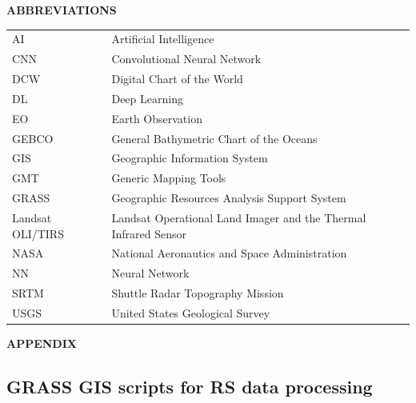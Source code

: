 \documentclass[12pt,a4paper,oneside]{article}
\def \newsection{\vspace{12pt}\textbf}
\begin{document}
\vspace{12pt}

\newsection {ABBREVIATIONS}
\vspace{12pt}

\begin{tabular}{@{}ll}
AI & Artificial Intelligence \\
CNN & Convolutional Neural Network \\
DCW & Digital Chart of the World \\
DL & Deep Learning \\
EO & Earth Observation\\
GEBCO & General Bathymetric Chart of the Oceans \\
GIS & Geographic Information System \\
GMT & Generic Mapping Tools \\
GRASS & Geographic Resources Analysis Support System \\
Landsat OLI/TIRS & Landsat Operational Land Imager and the Thermal Infrared Sensor \\
NASA & National Aeronautics and Space Administration \\
NN & Neural Network \\
SRTM & Shuttle Radar Topography Mission \\
USGS & United States Geological Survey
\end{tabular}

\vspace{12pt}

\newsection {APPENDIX}\label{App}
\vspace{12pt}

\subsection*{GRASS GIS scripts for RS data processing}
\end{document}
